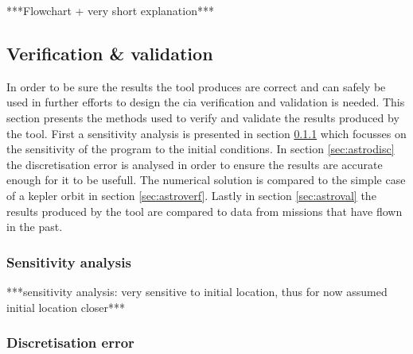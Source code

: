 ***Flowchart + very short explanation***\\

\subsection{Verification \& validation}
\label{sec:astrovv}
In order to be sure the results the tool produces are correct and can safely be used in further efforts to design the \gls{cia} verification and validation is needed. This section presents the methods used to verify and validate the results produced by the tool. First a sensitivity analysis is presented in section \ref{sec:astrosens} which focusses on the sensitivity of the program to the initial conditions. In section \ref{sec:astrodisc} the discretisation error is analysed in order to ensure the results are accurate enough for it to be usefull. The numerical solution is compared to the simple case of a kepler orbit in section \ref{sec:astroverf}. Lastly in section \ref{sec:astroval} the results produced by the tool are compared to data from missions that have flown in the past.

\subsubsection{Sensitivity analysis}
\label{sec:astrosens}
***sensitivity analysis: very sensitive to initial location, thus for now assumed initial location closer***\\

\subsubsection{Discretisation error}



